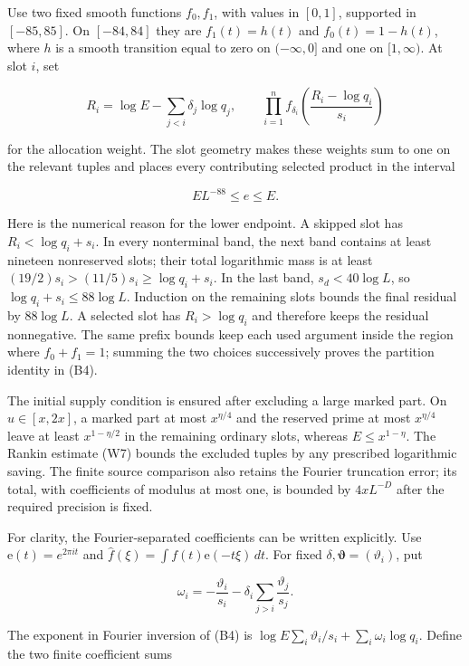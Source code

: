 Use two fixed smooth functions \(f_0,f_1\), with values in \([0,1]\),
supported in \([-85,85]\). On \([-84,84]\) they are \(f_1(t)=h(t)\) and
\(f_0(t)=1-h(t)\), where \(h\) is a smooth transition equal to zero on
\((-\infty,0]\) and one on \([1,\infty)\). At slot \(i\), set

\[
R_i=\log E-\sum_{j<i}\delta_j\log q_j,
\qquad
\prod_{i=1}^n f_{\delta_i}\left(\frac{R_i-\log q_i}{s_i}\right)
\tag{B4}
\]

for the allocation weight. The slot geometry makes these weights sum to
one on the relevant tuples and places every contributing selected
product in the interval

\[
EL^{-88}\le e\le E. \tag{B5}
\]

Here is the numerical reason for the lower endpoint. A skipped slot has
\(R_i<\log q_i+s_i\). In every nonterminal band, the next band contains
at least nineteen nonreserved slots; their total logarithmic mass is at
least \((19/2)s_i>(11/5)s_i\ge\log q_i+s_i\). In the last band,
\(s_d<40\log L\), so \(\log q_i+s_i\le88\log L\). Induction on the
remaining slots bounds the final residual by \(88\log L\). A selected
slot has \(R_i>\log q_i\) and therefore keeps the residual nonnegative.
The same prefix bounds keep each used argument inside the region where
\(f_0+f_1=1\); summing the two choices successively proves the partition
identity in (B4).

The initial supply condition is ensured after excluding a large marked
part. On \(u\in[x,2x]\), a marked part at most \(x^{\eta/4}\) and the
reserved prime at most \(x^{\eta/4}\) leave at least \(x^{1-\eta/2}\) in
the remaining ordinary slots, whereas \(E\le x^{1-\eta}\). The Rankin
estimate (W7) bounds the excluded tuples by any prescribed logarithmic
saving. The finite source comparison also retains the Fourier truncation
error; its total, with coefficients of modulus at most one, is bounded
by \(4xL^{-D}\) after the required precision is fixed.

For clarity, the Fourier-separated coefficients can be written
explicitly. Use \(\mathrm e(t)=e^{2\pi it}\) and
\(\widehat f(\xi)=\int f(t)\mathrm e(-t\xi)\,dt\). For fixed
\(\delta,\boldsymbol\vartheta=(\vartheta_i)\), put

\[
\omega_i=-\frac{\vartheta_i}{s_i}
 -\delta_i\sum_{j>i}\frac{\vartheta_j}{s_j}.
\]

The exponent in Fourier inversion of (B4) is
\(\log E\sum_i\vartheta_i/s_i+\sum_i\omega_i\log q_i\). Define the two
finite coefficient sums

